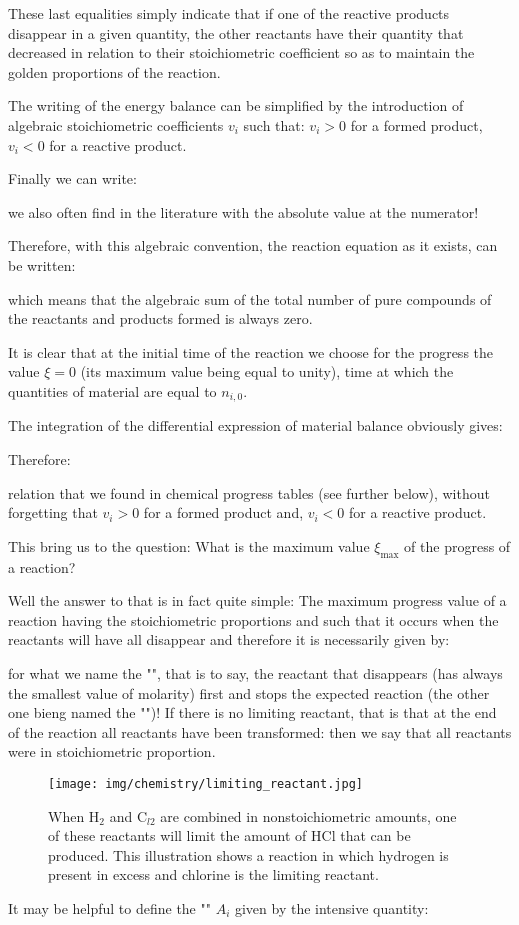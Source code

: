 	These last equalities simply indicate that if one of the reactive products disappear in a given quantity, the other reactants have their quantity that decreased in relation to their stoichiometric coefficient so as to maintain the golden proportions of the reaction.
	
		The writing of the energy balance can be simplified by the introduction of algebraic stoichiometric coefficients $v_i$ such that: $v_i>0$ for a formed product, $v_i<0$ for a reactive product.

	Finally we can write:
	
	we also often find in the literature with the absolute value at the numerator!

	Therefore, with this algebraic convention, the reaction equation as it exists, can be written:
	
	which means that the algebraic sum of the total number of pure compounds of the reactants and products formed is always zero.

	It is clear that at the initial time of the reaction we choose for the progress the value $\xi=0$ (its maximum value being equal to unity), time at which the quantities of material are equal to $n_{i,0}$.

	The integration of the differential expression of material balance obviously gives:
	
	Therefore:
	
	relation that we found in chemical progress tables (see further below), without forgetting that $v_i>0$ for a formed product and, $v_i<0$ for a reactive product.

	This bring us to the question: What is the maximum value $\xi_{\max}$ of the progress of a reaction? 

	Well the answer to that is in fact quite simple: The maximum progress value of a reaction having the stoichiometric proportions and such that it occurs when the reactants will have all disappear and therefore it is necessarily given by:
	
	for what we name the "", that is to say, the reactant that disappears (has always the smallest value of molarity) first and stops the expected reaction (the other one bieng named the "")! If there is no limiting reactant, that is that at the end of the reaction all reactants have been transformed: then we say that all reactants were in stoichiometric proportion.
	\begin{figure}[H]
		\centering
		\texttt{[image: img/chemistry/limiting\_reactant.jpg]}
		\caption[Limiting reactant illustration]{When $\mathrm{H}_2$ and $\mathrm{C}_{l2}$ are combined in nonstoichiometric amounts, one of these reactants will limit the amount of $\mathrm{HCl}$ that can be produced. This illustration shows a reaction in which hydrogen is present in excess and chlorine is the limiting reactant.}
	\end{figure}
	It may be helpful to define the "" $A_i$ given by the intensive quantity:
	
